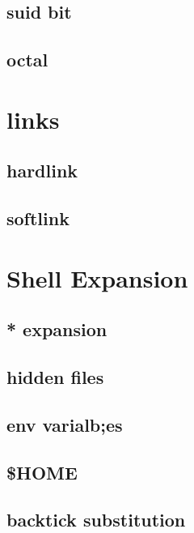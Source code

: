 \documentclass[hyperref={pdfpagelabels=false}]{beamer}
\begin{document}
\subsection{suid bit}
\subsection{octal}
\section{links}
\subsection{hardlink}
\subsection{softlink}
\section{Shell Expansion}
\subsection{* expansion}
\subsection{hidden files}
\subsection{env varialb;es}
\subsection{\$HOME}
\subsection{backtick substitution}
\end{document}
